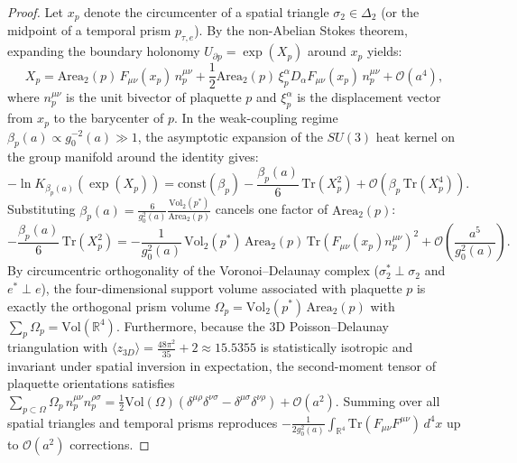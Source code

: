 \documentclass[11pt, a4paper]{article}
\theoremstyle{definition}
\theoremstyle{remark}
\begin{document}
\begin{proof}
Let $x_{p}$ denote the circumcenter of a spatial triangle $\sigma_{2} \in \Delta_{2}$ (or the midpoint of a temporal prism $p_{\tau, e}$). By the non-Abelian Stokes theorem, expanding the boundary holonomy $U_{\partial p} = \exp(X_{p})$ around $x_{p}$ yields:
\begin{equation}
  X_{p} = \mathrm{Area}_{2}(p)\,F_{\mu\nu}(x_{p})\,n_{p}^{\mu\nu} + \frac{1}{2}\mathrm{Area}_{2}(p)\,\xi_{p}^{\alpha} D_{\alpha}F_{\mu\nu}(x_{p})\,n_{p}^{\mu\nu} + \mathcal{O}(a^{4}),
\end{equation}
where $n_{p}^{\mu\nu}$ is the unit bivector of plaquette $p$ and $\xi_{p}^{\alpha}$ is the displacement vector from $x_{p}$ to the barycenter of $p$. In the weak-coupling regime $\beta_{p}(a) \propto g_{0}^{-2}(a) \gg 1$, the asymptotic expansion of the $SU(3)$ heat kernel on the group manifold around the identity gives:
\begin{equation}
  -\ln K_{\beta_{p}(a)}\!\left(\exp(X_{p})\right) = \mathrm{const}(\beta_{p}) - \frac{\beta_{p}(a)}{6}\,\mathrm{Tr}(X_{p}^{2}) + \mathcal{O}\!\left(\beta_{p}\,\mathrm{Tr}(X_{p}^{4})\right).
\end{equation}
Substituting $\beta_{p}(a) = \frac{6}{g_{0}^{2}(a)} \frac{\mathrm{Vol}_{2}(p^{*})}{\mathrm{Area}_{2}(p)}$ cancels one factor of $\mathrm{Area}_{2}(p)$:
\begin{equation}
  -\frac{\beta_{p}(a)}{6}\,\mathrm{Tr}(X_{p}^{2}) = -\frac{1}{g_{0}^{2}(a)}\,\mathrm{Vol}_{2}(p^{*})\,\mathrm{Area}_{2}(p)\,\mathrm{Tr}\!\left(F_{\mu\nu}(x_{p})n_{p}^{\mu\nu}\right)^{2} + \mathcal{O}\!\left(\frac{a^{5}}{g_{0}^{2}(a)}\right).
\end{equation}
By circumcentric orthogonality of the Voronoi--Delaunay complex ($\sigma_{2}^{*} \perp \sigma_{2}$ and $e^{*} \perp e$), the four-dimensional support volume associated with plaquette $p$ is exactly the orthogonal prism volume $\Omega_{p} = \mathrm{Vol}_{2}(p^{*})\,\mathrm{Area}_{2}(p)$ with $\sum_{p} \Omega_{p} = \mathrm{Vol}(\mathbb{R}^{4})$. Furthermore, because the 3D Poisson--Delaunay triangulation with $\langle z_{3D} \rangle = \frac{48\pi^{2}}{35} + 2 \approx 15.5355$ is statistically isotropic and invariant under spatial inversion in expectation, the second-moment tensor of plaquette orientations satisfies $\sum_{p \subset \Omega} \Omega_{p}\,n_{p}^{\mu\nu}n_{p}^{\rho\sigma} = \frac{1}{2}\mathrm{Vol}(\Omega)(\delta^{\mu\rho}\delta^{\nu\sigma} - \delta^{\mu\sigma}\delta^{\nu\rho}) + \mathcal{O}(a^{2})$. Summing over all spatial triangles and temporal prisms reproduces $-\frac{1}{2g_{0}^{2}(a)}\int_{\mathbb{R}^{4}} \mathrm{Tr}(F_{\mu\nu}F^{\mu\nu})\,d^{4}x$ up to $\mathcal{O}(a^{2})$ corrections.
\end{proof}
\end{document}
